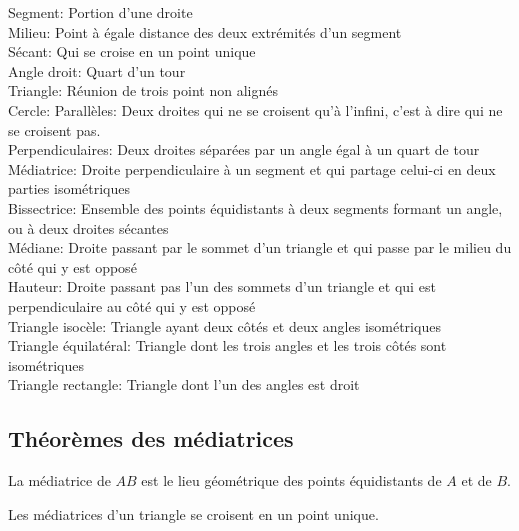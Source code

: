 Segment: Portion d'une droite\\
Milieu: Point à égale distance des deux extrémités d'un segment\\
Sécant: Qui se croise en un point unique\\
Angle droit: Quart d'un tour\\
Triangle: Réunion de trois point non alignés\\
Cercle: 
Parallèles: Deux droites qui ne se croisent qu'à l'infini, c'est à dire qui ne se croisent pas.\\
Perpendiculaires: Deux droites séparées par un angle égal à un quart de tour\\
Médiatrice: Droite perpendiculaire à un segment et qui partage celui-ci en deux parties isométriques\\
Bissectrice: Ensemble des points équidistants à deux segments formant un angle, ou à deux droites sécantes\\
Médiane: Droite passant par le sommet d'un triangle et qui passe par le milieu du côté qui y est opposé\\
Hauteur: Droite passant pas l'un des sommets d'un triangle et qui est perpendiculaire au côté qui y est opposé\\
Triangle isocèle: Triangle ayant deux côtés et deux angles isométriques\\
Triangle équilatéral: Triangle dont les trois angles et les trois côtés sont isométriques\\
Triangle rectangle: Triangle dont l'un des angles est droit





\subsection{Théorèmes des médiatrices}
\begin{theorem}
La médiatrice de $AB$ est le lieu géométrique des points équidistants de $A$ et de $B$.
\end{theorem}
\begin{theorem}
Les médiatrices d'un triangle se croisent en un point unique.
\end{theorem}


